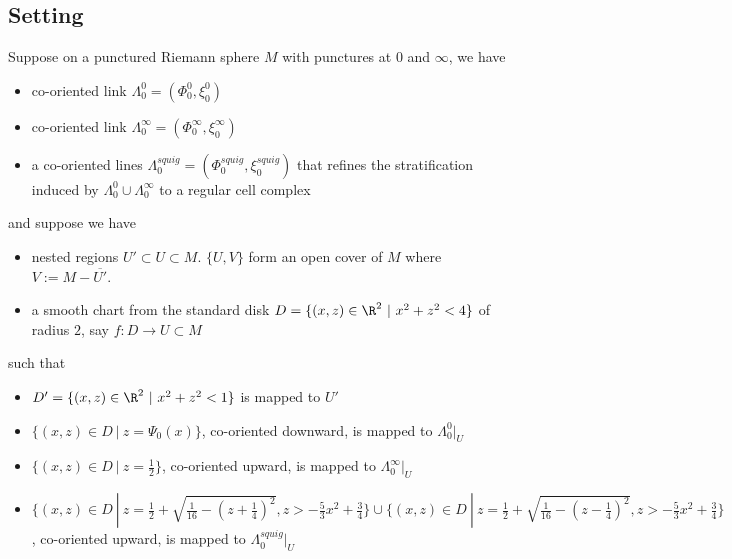 \subsection{Setting}
Suppose on a punctured Riemann sphere $M$ with punctures at $0$ and $\infty$, we have 
\begin{itemize}
\item co-oriented link $\Lambda_0^0 = (\Phi_0^0,\xi_0^0)$

\item co-oriented link $\Lambda_0^\infty = (\Phi_0^\infty,\xi_0^\infty)$

\item a co-oriented lines $\Lambda_0^{squig} = (\Phi_0^{squig}, \xi_0^{squig})$ that refines the stratification induced by $\Lambda_0^0 \cup \Lambda_0^\infty$ to a regular cell complex 
\end{itemize}
and suppose we have 
\begin{itemize}
\item nested regions $U' \subset U \subset M$. $\{U,V\}$ form an open cover of $M$ where $V:= M - \overline{U'}$.

\item a smooth chart from the standard disk $D = \{(x,z)\in \R^2 ~|~ x^2+z^2 < 4 \}$ of radius $2$, say $f: D  \rightarrow U \subset M$
\end{itemize}
such that 
\begin{itemize}
\item $D' = \{(x,z)\in \R^2 ~|~ x^2+z^2 < 1\}$ is mapped to $U'$ 

\item $\{(x,z)\in D ~|~ z = \Psi_0(x) \}$, co-oriented downward, is mapped to $\Lambda_0^0 |_{U}$

\item $\{(x,z)\in D ~|~ z = \frac{1}{2} \}$, co-oriented upward, is mapped to $\Lambda_0^\infty |_{U}$

\item $\{(x,z)\in D ~|~ z=\frac{1}{2} + \sqrt{\frac{1}{16} - (z+\frac{1}{4})^2}, z > -\frac{5}{3}x^2 + \frac{3}{4} \} \cup \{(x,z)\in D ~|~ z=\frac{1}{2} + \sqrt{\frac{1}{16} - (z-\frac{1}{4})^2}, z > -\frac{5}{3}x^2 + \frac{3}{4} \}$, co-oriented upward, is mapped to $\Lambda_0^{squig} |_{U}$
\end{itemize}

